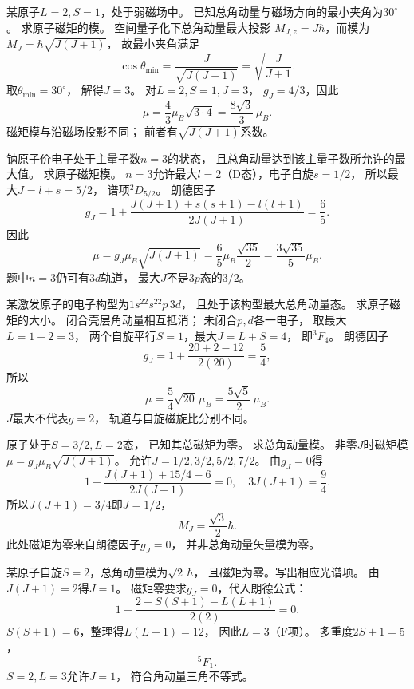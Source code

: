 某原子$L=2,S=1$，处于弱磁场中。
已知总角动量与磁场方向的最小夹角为$30^\circ$。
求原子磁矩的模。
\exsolution
空间量子化下总角动量最大投影
$M_{J,z}=J\hbar$，而模为
$M_J=\hbar\sqrt{J(J+1)}$，
故最小夹角满足
\[
 \cos\theta_{\min}=
 \frac J{\sqrt{J(J+1)}}=
 \sqrt{\frac J{J+1}}.
\]
取$\theta_{\min}=30^\circ$，
解得$J=3$。
对$L=2,S=1,J=3$，
$g_J=4/3$，因此
\[
 \boxed{\mu=\frac43\mu_B\sqrt{3\cdot4}
 =\frac{8\sqrt3}{3}\,\mu_B}.
\]
\excheck 磁矩模与沿磁场投影不同；
前者有$\sqrt{J(J+1)}$系数。

钠原子价电子处于主量子数$n=3$的状态，
且总角动量达到该主量子数所允许的最大值。
求原子磁矩模。
\exsolution
$n=3$允许最大$l=2$（D态），电子自旋$s=1/2$，
所以最大$J=l+s=5/2$，
谱项\({}^{2}D_{5/2}\)。
朗德因子
\[
 g_J=1+\frac{J(J+1)+s(s+1)-l(l+1)}
 {2J(J+1)}
 =\frac65.
\]
因此
\[
 \boxed{\mu=g_J\mu_B\sqrt{J(J+1)}
 =\frac65\mu_B\frac{\sqrt{35}}2
 =\frac{3\sqrt{35}}5\mu_B}.
\]
\excheck 题中$n=3$仍可有$3d$轨道，
最大$J$不是$3p$态的$3/2$。

某激发原子的电子构型为$1s^22s^22p\,3d$，
且处于该构型最大总角动量态。
求原子磁矩的大小。
\exsolution
闭合壳层角动量相互抵消；
未闭合$p,d$各一电子，
取最大$L=1+2=3$，
两个自旋平行$S=1$，最大$J=L+S=4$，
即\({}^{3}F_4\)。
朗德因子
\[
 g_J=1+\frac{20+2-12}{2(20)}=\frac54,
\]
所以
\[
 \boxed{\mu=\frac54\sqrt{20}\,\mu_B
 =\frac{5\sqrt5}2\,\mu_B}.
\]
\excheck $J$最大不代表$g=2$，
轨道与自旋磁旋比分别不同。

原子处于$S=3/2,L=2$态，
已知其总磁矩为零。
求总角动量模。
\exsolution
非零$J$时磁矩模
$\mu=g_J\mu_B\sqrt{J(J+1)}$。
允许$J=1/2,3/2,5/2,7/2$。
由$g_J=0$得
\[
 1+\frac{J(J+1)+15/4-6}{2J(J+1)}=0,
\quad3J(J+1)=\frac94.
\]
所以$J(J+1)=3/4$即$J=1/2$，
\[
 \boxed{M_J=\frac{\sqrt3}2\hbar}.
\]
\excheck 此处磁矩为零来自朗德因子$g_J=0$，
并非总角动量矢量模为零。

某原子自旋$S=2$，总角动量模为$\sqrt2\,\hbar$，
且磁矩为零。写出相应光谱项。
\exsolution
由$J(J+1)=2$得$J=1$。
磁矩零要求$g_J=0$，代入朗德公式：
\[
 1+\frac{2+S(S+1)-L(L+1)}{2(2)}=0.
\]
$S(S+1)=6$，整理得$L(L+1)=12$，
因此$L=3$（F项）。
多重度$2S+1=5$，
\[
 \boxed{{}^{5}F_1}.
\]
\excheck $S=2,L=3$允许$J=1$，
符合角动量三角不等式。

